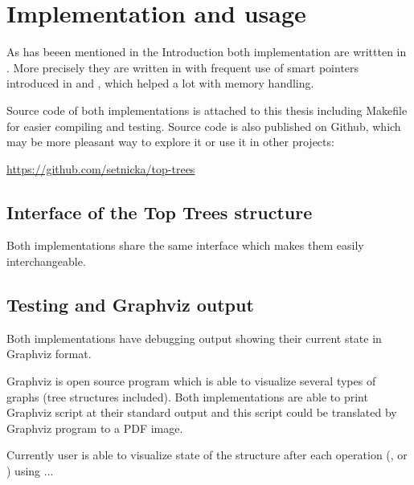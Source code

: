 \chapter{Implementation and usage}
\label{chap:Implementation}

As has beeen mentioned in the Introduction both implementation are writtten
in \Cpp. More precisely they are written in  with frequent use of smart
pointers introduced in  and , which helped a lot with memory handling.

Source code of both implementations is attached to this thesis including
Makefile for easier compiling and testing. Source code is also published on
Github, which may be more pleasant way to explore it or use it in other
projects:

\bigskip
\centerline{\url{https://github.com/setnicka/top-trees}}
\bigskip

\section{Interface of the Top Trees structure}

Both implementations share the same interface which makes them easily
interchangeable.


\section{Testing and Graphviz output}

Both implementations have debugging output showing their current state
in Graphviz format.

Graphviz is open source program which is able to visualize several types of
graphs (tree structures included). Both implementations are able to print
Graphviz script at their standard output and this script could be translated by
Graphviz program to a PDF image.

Currently user is able to visualize state of the structure after each operation
(\Cut, \Link or \Expose) using ... 
